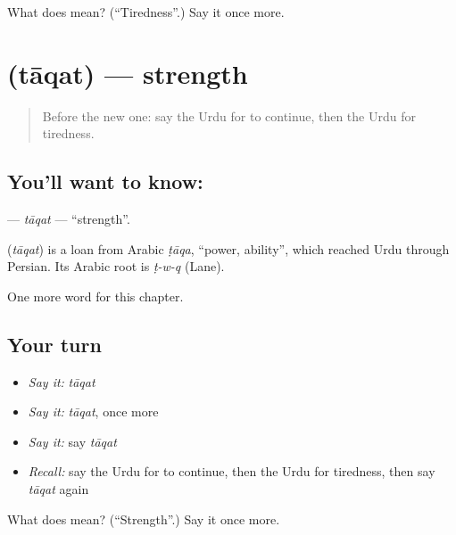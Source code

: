 \begin{tcolorbox}[breakable,colback=teal!4,colframe=teal!35!black,title={Before you move on}]
What does  mean? (\textquotedblleft{}Tiredness\textquotedblright{}.) Say it once more.
\end{tcolorbox}
\section[\texorpdfstring{\ur{طاقت} (tāqat)}{طاقت (tāqat)}]{ (tāqat) — strength}

\label{lesson:UR-C243-taqat}



\begin{quote}
Before the new one: say the Urdu for to continue, then the Urdu for tiredness.
\end{quote}

\subsection*{You'll want to know: }
\textbf{} — \emph{tāqat} — \textquotedblleft{}strength\textquotedblright{}.

\begin{cousinweb}
\textbf{} (\emph{tāqat}) is a loan from Arabic \emph{ṭāqa}, \textquotedblleft{}power, ability\textquotedblright{}, which reached Urdu through Persian. Its Arabic root is \emph{ṭ-w-q} (Lane).
\end{cousinweb}

\begin{grammarlens}[title={What you've built}]
One more word for this chapter.
\end{grammarlens}

\subsection*{Your turn}
\begin{itemize}
\raggedright
  \item \emph{Say it:} \emph{tāqat}
  \item \emph{Say it:} \emph{tāqat}, once more
  \item \emph{Say it:} say \emph{tāqat}
  \item \emph{Recall:} say the Urdu for to continue, then the Urdu for tiredness, then say \emph{tāqat} again
\end{itemize}

\begin{tcolorbox}[breakable,colback=teal!4,colframe=teal!35!black,title={Before you move on}]
What does  mean? (\textquotedblleft{}Strength\textquotedblright{}.) Say it once more.
\end{tcolorbox}
